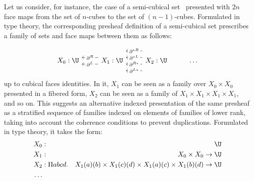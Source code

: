 \documentclass{msc}
\newcommand{\kstar}{{\star}}
\begin{document}
Let us consider, for instance, the case of a semi-cubical set~\citep{grandis03,buchholtz17} presented with $2n$ face maps from the set of $n$-cubes to the set of $(n-1)$-cubes. Formulated in type theory, the corresponding presheaf definition of a semi-cubical set prescribes a family of sets and face
maps between them as follows:

\begin{equation*}
  \begin{tikzcd}
    X_0: \U & X_1: \U \arrow[l, "\partial^L" description, shift left=2] \arrow[l, "\partial^R" description, shift right=2] & X_2: \U \arrow[l, "\partial^{L\kstar}" description, shift left=6] \arrow[l, "\partial^{R\kstar}" description, shift left=2] \arrow[l, "\partial^{\kstar L}" description, shift right=2] \arrow[l, "\partial^{\kstar R}" description, shift right=6] & \ldots
  \end{tikzcd}
\end{equation*}
up to cubical faces identities. In it, $X_1$ can be seen as a family over $X_0 \times X_0$ presented in a fibered form, $X_2$ can be seen as a family of $X_1 \times X_1 \times X_1 \times X_1$, and so on. This suggests an alternative indexed presentation of the same presheaf as a stratified sequence of families indexed on elements of families of lower rank, taking into account the coherence conditions to prevent duplications. Formulated in type theory, it takes the form:
\begin{align*}
  X_0 & :              & \U                                                                            \\
  X_1 & :              & X_0 \times X_0 \rightarrow \U                                                 \\
  X_2 & : \Pi a b c d. & X_1(a)(b) \times X_1 (c)(d) \times X_1(a)(c) \times X_1 (b)(d) \rightarrow \U \\
  \ldots
\end{align*}
\end{document}
